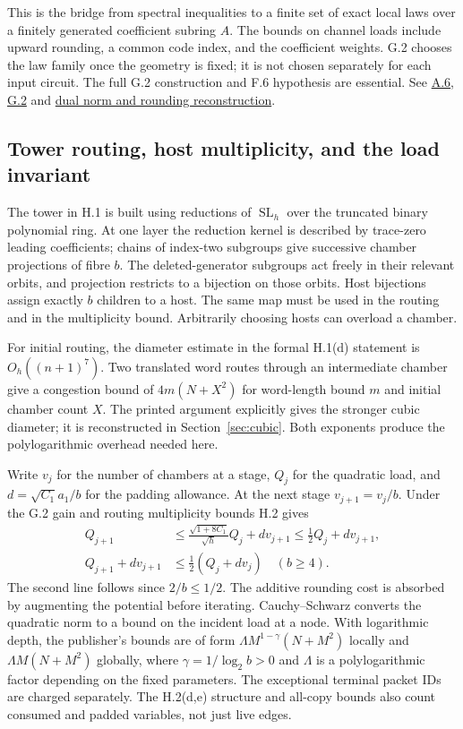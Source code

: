 \documentclass[11pt,letterpaper]{article}
\theoremstyle{definition}\newtheorem{definition}[theorem]{Definition}\newtheorem{example}[theorem]{Example}
\theoremstyle{remark}\newtheorem{remark}[theorem]{Remark}
\newcommand{\pub}[3]{\href{https://github.com/anthropics/formal-math/blob/11b6c7e3c927df2658f513b6b68ea7f8929c62c5/vp-vnp/#1\#L#2}{#3}}
\newcommand{\aud}[2]{\href{https://github.com/nousentllc/VP-VNP-Review/blob/567303d0bcf4f9d54390437b137752446e58ccd6/#1}{#2}}
\begin{document}
This is the bridge from spectral inequalities to a finite set of exact local laws over a finitely generated coefficient subring $A$. The bounds on channel loads include upward rounding, a common code index, and the coefficient weights. G.2 chooses the law family once the geometry is fixed; it is not chosen separately for each input circuit. The full G.2 construction and F.6 hypothesis are essential. See \pub{Paper/Gauges.lean}{560}{A.6}, \pub{Paper/Laws.lean}{425}{G.2} and \aud{passes/pass13B-gain.md}{dual norm and rounding reconstruction}.

\subsection{Tower routing, host multiplicity, and the load invariant}\label{sec:tower}
The tower in H.1 is built using reductions of $\operatorname{SL}_h$ over the truncated binary polynomial ring. At one layer the reduction kernel is described by trace-zero leading coefficients; chains of index-two subgroups give successive chamber projections of fibre $b$. The deleted-generator subgroups act freely in their relevant orbits, and projection restricts to a bijection on those orbits. Host bijections assign exactly $b$ children to a host. The same map must be used in the routing and in the multiplicity bound. Arbitrarily choosing hosts can overload a chamber.

For initial routing, the diameter estimate in the formal H.1(d) statement is $O_h((n+1)^7)$. Two translated word routes through an intermediate chamber give a congestion bound of $4m(N+X^2)$ for word-length bound $m$ and initial chamber count $X$. The printed argument explicitly gives the stronger cubic diameter; it is reconstructed in Section~\ref{sec:cubic}. Both exponents produce the polylogarithmic overhead needed here.

Write $v_j$ for the number of chambers at a stage, $Q_j$ for the quadratic load, and $d=\sqrt{C_1}a_1/b$ for the padding allowance. At the next stage $v_{j+1}=v_j/b$. Under the G.2 gain and routing multiplicity bounds H.2 gives
\begin{align}
 Q_{j+1}&\le \frac{\sqrt{1+8C_1}}{\sqrt h}Q_j+d v_{j+1}\le\tfrac12Q_j+d v_{j+1},\\
 Q_{j+1}+dv_{j+1}&\le\tfrac12(Q_j+dv_j)\quad(b\ge4).\label{eq:load}
\end{align}
The second line follows since $2/b\le1/2$. The additive rounding cost is absorbed by augmenting the potential before iterating. Cauchy--Schwarz converts the quadratic norm to a bound on the incident load at a node. With logarithmic depth, the publisher's bounds are of form $\Lambda M^{1-\gamma}(N+M^2)$ locally and $\Lambda M(N+M^2)$ globally, where $\gamma=1/\log_2b>0$ and $\Lambda$ is a polylogarithmic factor depending on the fixed parameters. The exceptional terminal packet IDs are charged separately. The H.2(d,e) structure and all-copy bounds also count consumed and padded variables, not just live edges.
\end{document}
